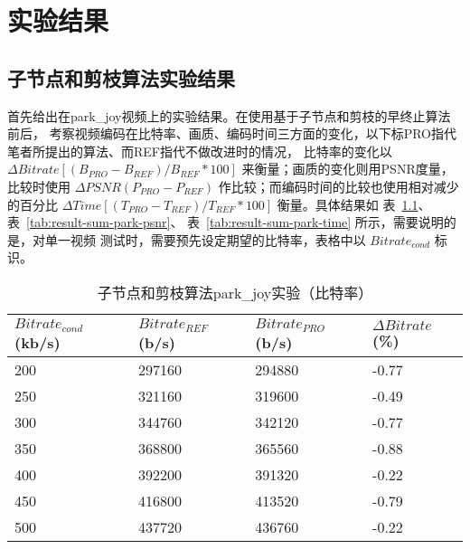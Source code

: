 \chapter{实验结果}
\label{cha:result}

\section{子节点和剪枝算法实验结果}

首先给出在park\_joy视频上的实验结果。在使用基于子节点和剪枝的早终止算法前后，
考察视频编码在比特率、画质、编码时间三方面的变化，以下标PRO指代笔者所提出的算法、而REF指代不做改进时的情况，
比特率的变化以 $\Delta Bitrate[ (B_{PRO} - B_{REF})/B_{REF} * 100 ]$ 来衡量；画质的变化则用PSNR度量，
比较时使用 $ \Delta PSNR(P_{PRO} - P_{REF})$ 作比较；而编码时间的比较也使用相对减少的百分比
 $ \Delta Time[ (T_{PRO} - T_{REF})/T_{REF} * 100 ]$ 衡量。具体结果如 表~\ref{tab:result-sum-park-bitrate}、
表~\ref{tab:result-sum-park-psnr}、 表~\ref{tab:result-sum-park-time} 所示，需要说明的是，对单一视频
测试时，需要预先设定期望的比特率，表格中以 $Bitrate_{cond}$ 标识。

\begin{table}[H]
  \centering
    \caption{子节点和剪枝算法park\_joy实验（比特率）}
    \label{tab:result-sum-park-bitrate}
    \begin{tabularx}{\linewidth}{XXXX}
      \toprule[1.5pt]
      $Bitrate_{cond}$(kb/s) & $Bitrate_{REF}$(b/s) & $Bitrate_{PRO}$(b/s) & $\Delta Bitrate$(\%) \\
      \midrule[1pt]
      200 & 297160 & 294880 & -0.77  \\
      250 & 321160 & 319600 & -0.49 \\
      300 & 344760 & 342120 & -0.77  \\
      350 & 368800 & 365560 & -0.88 \\
      400 & 392200 & 391320 & -0.22  \\
      450 & 416800 & 413520 & -0.79 \\
      500 & 437720 & 436760 & -0.22  \\
      \bottomrule[1.5pt]
    \end{tabularx}
\end{table}

